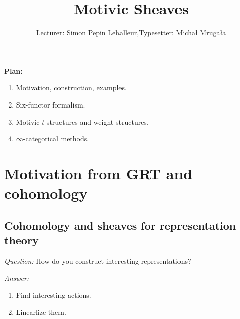

\usepackage{mathtools}

\def\Cone{\operatorname{Cone}}
\def\Ch{\cat{Ch}}
\def\ft{^{\text{(f.t)}}}
\def\Sm{\cat{Sm}}
\DeclareMathOperator{\hocolim}{hocolim}
\def\Sing{\operatorname{Sing}}
\def\F{\bb{F}}
\def\Ga{\mathbb{G}_a}
\def\Gm{\mathbb{G}_m}
\def\Fr{\operatorname{Fr}}
\def\PSp{\operatorname{PSp}}
\def\Sp{\operatorname{Sp}}
\def\Ev{\operatorname{Ev}}
\def\Sus{\operatorname{Sus}}
\def\Et{\cat{Et}}
\def\Ind{\operatorname{Ind}}
\def\rank{\operatorname{rank}}
\def\Bl{\operatorname{Bl}}
\def\Sch{\cat{Sch}}
\def\kz{\mathfrak{z}}
\def\Chow{\operatorname{CH}}
\def\Sym{\operatorname{Sym}}
\def\kg{\mathfrak{g}}
\def\PrL{\operatorname{Pr}^L}
\def\1b{\mathbb{1}}
\def\car{\operatorname{char}}
\def\Repf{\cat{Rep}^{\text{f.d.}}}

\title{Motivic Sheaves}
\author{Lecturer: Simon Pepin Lehalleur,\quad Typesetter: Micha{\l} Mruga{\l}a}


\maketitle
\textbf{Plan:}
\begin{enumerate}[L1:]
	\item Motivation, construction, examples.
	\item Six-functor formalism.
	\item Motivic $t$-structures and weight structures.
	\item $\infty$-categorical methods.
\end{enumerate}
\section{Motivation from GRT and cohomology}
\subsection{Cohomology and sheaves for representation theory} \leavevmode


\emph{Question:} How do you construct interesting representations?

\emph{Answer:}
\begin{enumerate}[1)]
	\item Find interesting actions.
	\item Linearlize them.
\end{enumerate}


